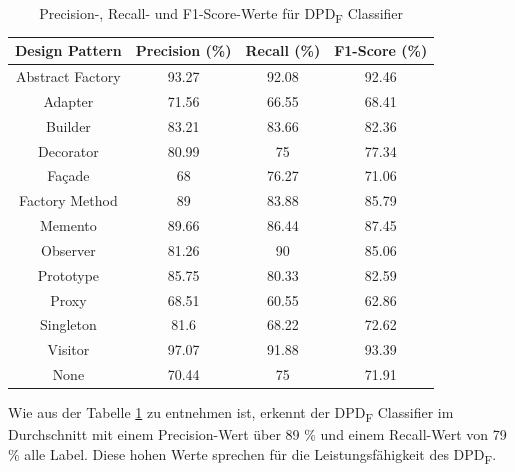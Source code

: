 \documentclass[conference]{IEEEtran}
\begin{document}
\begin{table}[h]
    \caption{Precision-, Recall- und F1-Score-Werte für DPD\textsubscript{F} Classifier}
    \label{table:7}
    \begin{tabular}{|c|c|c|c|}
        \hline
        Design Pattern   & Precision (\%) & Recall (\%) & F1-Score (\%) \\
        \hline
        Abstract Factory & 93.27          & 92.08       & 92.46         \\
        \hline
        Adapter          & 71.56          & 66.55       & 68.41         \\
        \hline
        Builder          & 83.21          & 83.66       & 82.36         \\
        \hline
        Decorator        & 80.99          & 75          & 77.34         \\
        \hline
        Façade           & 68             & 76.27       & 71.06         \\
        \hline
        Factory Method   & 89             & 83.88       & 85.79         \\
        \hline
        Memento          & 89.66          & 86.44       & 87.45         \\
        \hline
        Observer         & 81.26          & 90          & 85.06         \\
        \hline
        Prototype        & 85.75          & 80.33       & 82.59         \\
        \hline
        Proxy            & 68.51          & 60.55       & 62.86         \\
        \hline
        Singleton        & 81.6           & 68.22       & 72.62         \\
        \hline
        Visitor          & 97.07          & 91.88       & 93.39         \\
        \hline
        None             & 70.44          & 75          & 71.91         \\
        \hline
    \end{tabular}
\end{table}

Wie aus der Tabelle \ref{table:7} zu entnehmen ist, erkennt der DPD\textsubscript{F} Classifier im Durchschnitt mit einem Precision-Wert über 89 \% und einem Recall-Wert von 79 \% alle Label.
Diese hohen Werte sprechen für die Leistungsfähigkeit des DPD\textsubscript{F}.
\end{document}
